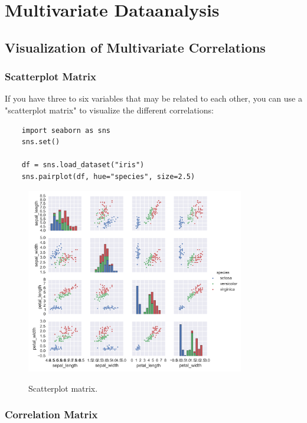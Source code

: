 \chapter{Multivariate Dataanalysis}

\section{Visualization of Multivariate Correlations}

\subsection{Scatterplot Matrix}

If you have three to six variables that may be related to each other, you can use a "scatterplot matrix" to visualize the different correlations:

\begin{lstlisting}
    import seaborn as sns
    sns.set()

    df = sns.load_dataset("iris")
    sns.pairplot(df, hue="species", size=2.5)
\end{lstlisting}

\begin{figure}
  \centering
  \includegraphics[width=0.85\textwidth]{../Images/multiScatterplot.png}\\
  \caption{Scatterplot matrix.}\label{fig:scatterplotMatrix}
\end{figure}


\subsection{Correlation Matrix}

